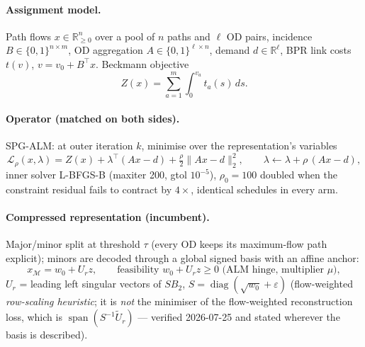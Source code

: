 \documentclass[11pt]{article}
\newcommand{\R}{\mathbb{R}}
\begin{document}
\paragraph{Assignment model.} Path flows $x\in\R^n_{\ge0}$ over a pool of $n$ paths and
$\ell$ OD pairs, incidence $B\in\{0,1\}^{n\times m}$, OD aggregation
$A\in\{0,1\}^{\ell\times n}$, demand $d\in\R^\ell$, BPR link costs $t(v)$,
$v=v_0+B^\top x$. Beckmann objective
\begin{equation}
Z(x)=\sum_{a=1}^{m}\int_0^{v_a} t_a(s)\,ds .
\end{equation}

\paragraph{Operator (matched on both sides).} SPG-ALM: at outer iteration $k$, minimise
over the representation's variables
\begin{equation}
\mathcal L_\rho(x,\lambda)=Z(x)+\lambda^\top(Ax-d)+\tfrac{\rho}{2}\|Ax-d\|_2^2,
\qquad \lambda\leftarrow\lambda+\rho\,(Ax-d),
\label{eq:alm}
\end{equation}
inner solver L-BFGS-B (maxiter 200, gtol $10^{-5}$), $\rho_0=100$ doubled when the
constraint residual fails to contract by $4\times$, identical schedules in every arm.

\paragraph{Compressed representation (incumbent).} Major/minor split at threshold $\tau$
(every OD keeps its maximum-flow path explicit); minors are decoded through a global
signed basis with an affine anchor:
\begin{equation}
x_{\mathcal M}=w_0+U_r z,\qquad \text{feasibility } w_0+U_r z\ge 0
\text{ (ALM hinge, multiplier }\mu\text{)} ,
\label{eq:decoder}
\end{equation}
$U_r$ = leading left singular vectors of $S B_2$, $S=\operatorname{diag}(\sqrt{w_0}+\varepsilon)$
(flow-weighted \emph{row-scaling heuristic}; it is \emph{not} the minimiser of the
flow-weighted reconstruction loss, which is $\operatorname{span}(S^{-1}\tilde U_r)$ ---
verified 2026-07-25 and stated wherever the basis is described).
\end{document}
